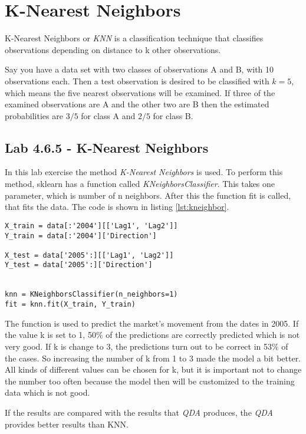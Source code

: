 \section{K-Nearest Neighbors}
K-Nearest Neighbors or \emph{KNN} is a classification technique that classifies observations depending on distance to k other observations. 

Say you have a  data set with two classes of observations A and B, with 10 observations each. Then a test observation is desired to be classified with $k=5$, which means the five nearest observations will be examined. If three of the examined observations are A and the other two are B then the estimated probabilities are $3/5$ for class A and $2/5$ for class B. 

\subsection{Lab 4.6.5 - K-Nearest Neighbors}

In this lab exercise the method \emph{K-Nearest Neighbors} is used. To perform this method, sklearn has a function called \emph{KNeighborsClassifier}. This takes one parameter, which is number of n neighbors. After this the function fit is called, that fits the data.
The code is shown in listing \ref{lst:kneighbor}.

\begin{lstlisting}[caption={Python KNN function, where k is set to 1}, label=lst:kneighbor, mathescape=true]
X_train = data[:'2004'][['Lag1', 'Lag2']]
Y_train = data[:'2004']['Direction']

X_test = data['2005':][['Lag1', 'Lag2']]
Y_test = data['2005':]['Direction']


knn = KNeighborsClassifier(n_neighbors=1)
fit = knn.fit(X_train, Y_train)
\end{lstlisting}

The function is used to predict the market's movement from the dates in 2005. If the value k is set to 1, 50\% of the predictions are correctly predicted which is not very good.
If k is change to 3, the predictions turn out to be correct in 53\% of the cases. So increasing the number of k from 1 to 3 made the model a bit better. All kinds of different values can be chosen for k, but it is important not to change the number too often because the model then will be customized to the training data which is not good.

If the results are compared with the results that \emph{QDA} produces, the \emph{QDA} provides better results than KNN.